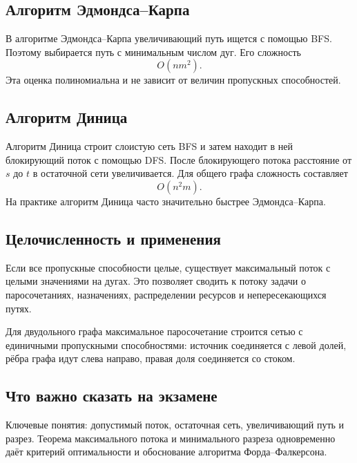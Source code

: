 \subsection{Алгоритм Эдмондса--Карпа}

В алгоритме Эдмондса--Карпа увеличивающий путь ищется с помощью BFS.
Поэтому выбирается путь с минимальным числом дуг. Его сложность
\[
    O(nm^2).
\]
Эта оценка полиномиальна и не зависит от величин пропускных способностей.

\subsection{Алгоритм Диница}

Алгоритм Диница строит слоистую сеть BFS и затем находит в ней блокирующий поток
с помощью DFS. После блокирующего потока расстояние от $s$ до $t$ в остаточной
сети увеличивается. Для общего графа сложность составляет
\[
    O(n^2m).
\]
На практике алгоритм Диница часто значительно быстрее Эдмондса--Карпа.

\subsection{Целочисленность и применения}

Если все пропускные способности целые, существует максимальный поток с целыми
значениями на дугах. Это позволяет сводить к потоку задачи о паросочетаниях,
назначениях, распределении ресурсов и непересекающихся путях.

Для двудольного графа максимальное паросочетание строится сетью с единичными
пропускными способностями: источник соединяется с левой долей, рёбра графа идут
слева направо, правая доля соединяется со стоком.

\subsection{Что важно сказать на экзамене}

Ключевые понятия: допустимый поток, остаточная сеть, увеличивающий путь и разрез.
Теорема максимального потока и минимального разреза одновременно даёт критерий
оптимальности и обоснование алгоритма Форда--Фалкерсона.
